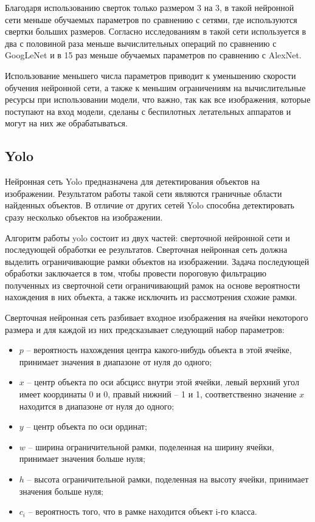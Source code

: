 Благодаря использованию сверток только размером 3 на 3, в такой нейронной сети меньше обучаемых параметров по сравнению с сетями, где используются свертки больших размеров. Согласно исследованиям \cite{mobilenets} в такой сети используется в два с половиной раза меньше вычислительных операций по сравнению с GoogLeNet и в 15 раз меньше обучаемых параметров по сравнению с AlexNet.

Использование меньшего числа параметров приводит к уменьшению скорости обучения нейронной сети, а также к меньшим ограничениям на вычислительные ресурсы при использовании модели, что важно, так как все изображения, которые поступают на вход модели, сделаны с беспилотных летательных аппаратов и могут на них же обрабатываться.

\subsection{Yolo}
Нейронная сеть Yolo предназначена для детектирования объектов на изображении. Результатом работы такой сети являются граничные области найденных объектов. В отличие от других сетей Yolo способна детектировать сразу несколько объектов на изображении.

Алгоритм работы yolo состоит из двух частей: сверточной нейронной сети и последующей обработки ее результатов. Сверточная нейронная сеть должна выделить ограничивающие рамки объектов на изображении. Задача последующей обработки заключается в том, чтобы провести пороговую фильтрацию полученных из сверточной сети ограничивающий рамок на основе вероятности нахождения в них объекта, а также исключить из рассмотрения схожие рамки.

Сверточная нейронная сеть разбивает входное изображения на ячейки некоторого размера и для каждой из них предсказывает следующий набор параметров:
\begin{itemize}
	\item $p$ -- вероятность нахождения центра какого-нибудь объекта в этой ячейке, принимает значения в диапазоне от нуля до одного;
	\item $x$ -- центр объекта по оси абсцисс внутри этой ячейки, левый верхний угол имеет координаты 0 и 0, правый нижний -- 1 и 1, соответственно значение $x$ находится в диапазоне от нуля до одного;
	\item $y$ -- центр объекта по оси ординат;
	\item $w$ -- ширина ограничительной рамки, поделенная на ширину ячейки, принимает значения больше нуля;
	\item $h$ -- высота ограничительной рамки, поделенная на высоту ячейки, принимает значения больше нуля;
	\item $c_i$ -- вероятность того, что в рамке находится объект i-го класса.
\end{itemize}

